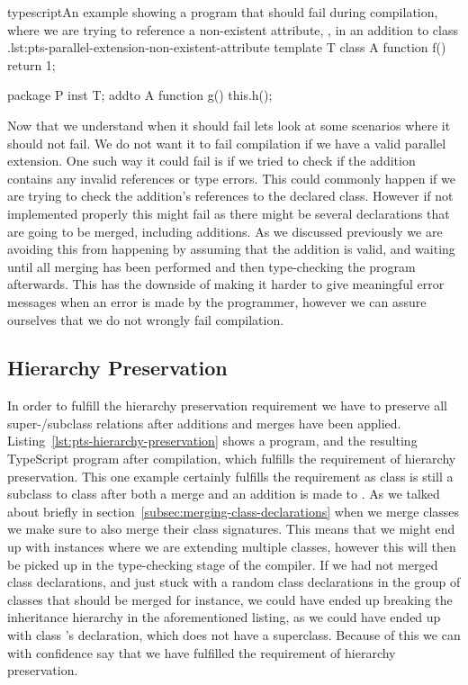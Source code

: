 \begin{code}{typescript}{An example showing a program that should fail during compilation, where we are trying to reference a non-existent attribute, , in an addition to class .}{lst:pts-parallel-extension-non-existent-attribute}
    template T {
        class A {
            function f() {
                return 1;
            }
        }
    }

    package P {
        inst T;
        addto A {
            function g() {
                this.h();
            }
        }
    }
\end{code}

Now that we understand when it should fail lets look at some scenarios where it should not fail.
We do not want it to fail compilation if we have a valid parallel extension.
One such way it could fail is if we tried to check if the addition contains any invalid references or type errors.
This could commonly happen if we are trying to check the addition's references to the declared class.
However if not implemented properly this might fail as there might be several declarations that are going to be merged, including additions.
As we discussed previously we are avoiding this from happening by assuming that the addition is valid, and waiting until all merging has been performed and then type-checking the program afterwards.
This has the downside of making it harder to give meaningful error messages when an error is made by the programmer, however we can assure ourselves that we do not wrongly fail compilation.

\subsection{Hierarchy Preservation}\label{subsec:pts-hierarchy-preservation}

In order to fulfill the hierarchy preservation requirement we have to preserve all super-/subclass relations after additions and merges have been applied.
Listing~\vref{lst:pts-hierarchy-preservation} shows a program, and the resulting TypeScript program after compilation, which fulfills the requirement of hierarchy preservation.
This one example certainly fulfills the requirement as class  is still a subclass to class  after both a merge and an addition is made to .
As we talked about briefly in section~\vref{subsec:merging-class-declarations} when we merge classes we make sure to also merge their class signatures.
This means that we might end up with instances where we are extending multiple classes, however this will then be picked up in the type-checking stage of the compiler.
If we had not merged class declarations, and just stuck with a random class declarations in the group of classes that should be merged for instance, we could have ended up breaking the inheritance hierarchy in the aforementioned listing, as we could have ended up with class 's declaration, which does not have a superclass.
Because of this we can with confidence say that we have fulfilled the requirement of hierarchy preservation.

